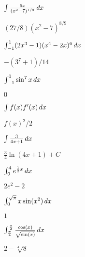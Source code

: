 \begin{exercises}
\begin{exercise} $\int {6x\over(x^2 - 7)^{1/9}}\, d x$
\begin{answer} $(27/8)(x^2-7)^{8/9}$
\end{answer}\end{exercise}

\begin{exercise} $\int_{-1}^1 (2x^3-1)(x^4-2x)^6\, d x$
\begin{answer} $-(3^7+1)/14$
\end{answer}\end{exercise}

\begin{exercise} $\int_{-1}^1 \sin^7 x\, d x$
\begin{answer} $0$
\end{answer}\end{exercise}

\begin{exercise} $\int f(x) f'(x)\, d x$ 
\begin{answer} $f(x)^2/2$
\end{answer}\end{exercise}

\begin{exercise} $\int \frac{3}{4x+1} \, d x$ 
\begin{answer} $\frac{3}{4} \ln(4x+1) +C$
\end{answer}\end{exercise}

\begin{exercise} $\int_{0}^{4} e^{\frac{1}{2} x} \, d x$ 
\begin{answer} $2 e^{2} -2$
\end{answer}\end{exercise}

\begin{exercise} $\int_{0}^{\sqrt{\pi}} x \sin(x^{2}) \, d x$ 
\begin{answer} $1$
\end{answer}\end{exercise}

\begin{exercise} $\int_{\frac{\pi}{4}}^{\frac{\pi}{2}} \frac{\cos(x)}{\sqrt{\sin(x)}} \, d x$ 
\begin{answer} $2 - \sqrt[4]{8}$
\end{answer}\end{exercise}

\endtwocol

\end{exercises}






